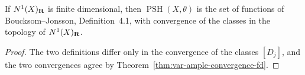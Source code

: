 \begin{corollary}
\label{cor:var-psh-curve-weak-fd}
\leanok
{}
If $N^1(X)_{\mathbf{R}}$ is finite dimensional, then $\operatorname{PSH}(X,\theta)$ is the set of
functions of Boucksom--Jonsson, Definition~4.1, with convergence of the classes in the topology
of $N^1(X)_{\mathbf{R}}$.
\end{corollary}
\begin{proof}
The two definitions differ only in the convergence of the classes $[D_j]$, and the two
convergences agree by Theorem~\ref{thm:var-ample-convergence-fd}.
\end{proof}
